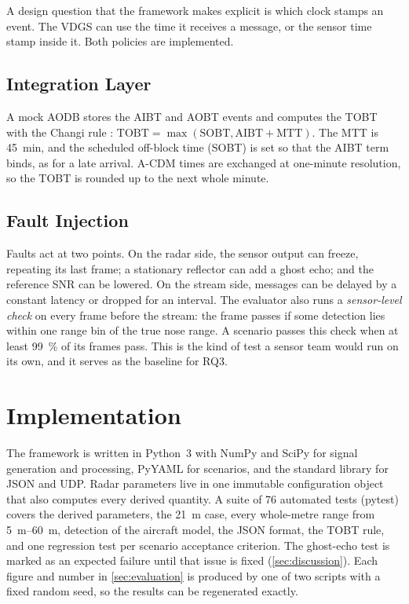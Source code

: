 \documentclass[conference]{IEEEtran}
\begin{document}
A design question that the framework makes explicit is which clock stamps an event. The VDGS can use the time it receives a message, or the sensor time stamp inside it. Both policies are implemented.

\subsection{Integration Layer}
A mock AODB stores the AIBT and AOBT events and computes the TOBT with the Changi rule \cite{caas_acdm}: $\text{TOBT} = \max(\text{SOBT}, \text{AIBT} + \text{MTT})$. The MTT is \SI{45}{\minute}, and the scheduled off-block time (SOBT) is set so that the AIBT term binds, as for a late arrival. A-CDM times are exchanged at one-minute resolution, so the TOBT is rounded up to the next whole minute.

\subsection{Fault Injection}
Faults act at two points. On the radar side, the sensor output can freeze, repeating its last frame; a stationary reflector can add a ghost echo; and the reference SNR can be lowered. On the stream side, messages can be delayed by a constant latency or dropped for an interval. The evaluator also runs a \emph{sensor-level check} on every frame before the stream: the frame passes if some detection lies within one range bin of the true nose range. A scenario passes this check when at least \SI{99}{\percent} of its frames pass. This is the kind of test a sensor team would run on its own, and it serves as the baseline for RQ3.

\section{Implementation}
\label{sec:implementation}
The framework is written in Python~3 with NumPy and SciPy for signal generation and processing, PyYAML for scenarios, and the standard library for JSON and UDP. Radar parameters live in one immutable configuration object that also computes every derived quantity. A suite of 76 automated tests (pytest) covers the derived parameters, the \SI{21}{\metre} case, every whole-metre range from \SIrange{5}{60}{\metre}, detection of the aircraft model, the JSON format, the TOBT rule, and one regression test per scenario acceptance criterion. The ghost-echo test is marked as an expected failure until that issue is fixed (\cref{sec:discussion}). Each figure and number in \cref{sec:evaluation} is produced by one of two scripts with a fixed random seed, so the results can be regenerated exactly.
\end{document}
